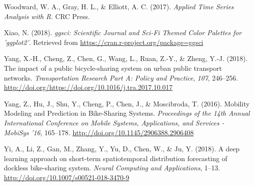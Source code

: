 \documentclass[12pt,oneside]{reedthesis}
\begin{document}
\hypertarget{ref-woodward2017}{}
Woodward, W. A., Gray, H. L., \& Elliott, A. C. (2017). \emph{Applied
Time Series Analysis with R}. CRC Press.

\hypertarget{ref-ggsci}{}
Xiao, N. (2018). \emph{ggsci: Scientific Journal and Sci-Fi Themed Color
Palettes for 'ggplot2'}. Retrieved from
\url{https://cran.r-project.org/package=ggsci}

\hypertarget{ref-yang2018}{}
Yang, X.-H., Cheng, Z., Chen, G., Wang, L., Ruan, Z.-Y., \& Zheng, Y.-J.
(2018). The impact of a public bicycle-sharing system on urban public
transport networks. \emph{Transportation Research Part A: Policy and
Practice}, \emph{107}, 246--256.
\url{http://doi.org/https://doi.org/10.1016/j.tra.2017.10.017}

\hypertarget{ref-yang2016}{}
Yang, Z., Hu, J., Shu, Y., Cheng, P., Chen, J., \& Moscibroda, T.
(2016). Mobility Modeling and Prediction in Bike-Sharing Systems.
\emph{Proceedings of the 14th Annual International Conference on Mobile
Systems, Applications, and Services - MobiSys '16}, 165--178.
\url{http://doi.org/10.1145/2906388.2906408}

\hypertarget{ref-yi2018}{}
Yi, A., Li, Z., Gan, M., Zhang, Y., Yu, D., Chen, W., \& Ju, Y. (2018).
A deep learning approach on short-term spatiotemporal distribution
forecasting of dockless bike-sharing system. \emph{Neural Computing and
Applications}, 1--13. \url{http://doi.org/10.1007/s00521-018-3470-9}


\end{document}
